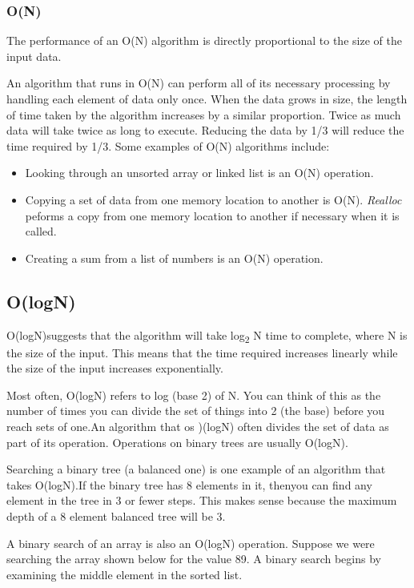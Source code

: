 \subsubsection{O(N)}

The performance of an O(N) algorithm  is directly
proportional to the size of the input data.

An algorithm that runs in O(N) can perform all of its necessary
processing by handling each element of data only once.  When the data
grows in size, the length of time taken by the algorithm increases by a
similar proportion.  Twice as much data will take twice as long to execute.  Reducing the data by 1/3 will reduce the time required by 1/3.
Some examples of O(N) algorithms include:

\begin{itemize}
\item
  \textbf{} Looking through an unsorted array or linked list is an O(N)
  operation.
\item
  Copying a set of data  from one memory location to another is O(N).  \textit{Realloc} peforms a copy from one memory location to another if necessary when it is called.
\item
  Creating a sum from a list of numbers is an O(N) operation.
\end{itemize}



\subsection{O(logN)}

O(logN)suggests that the algorithm will take
log\textsubscript{2} N time to complete, where N is the size of the
input. This means that the time required increases linearly while the
size of the input increases exponentially.

Most often, O(logN) refers to log (base 2) of N. You can think of this
as the number of times you can divide the set of things into 2 (the
base) before you reach sets of one.An algorithm that os )(logN) often
divides the set of data as part of its operation.   Operations on binary trees are usually O(logN).

Searching a binary tree (a balanced one) is one example of an algorithm
that takes O(logN).If the binary tree has 8 elements in it, thenyou can find any element in the tree in 3 or fewer steps. This
makes sense because the maximum depth of a 8 element balanced tree will
be 3.

A binary search of an array is also an O(logN) operation.  Suppose we were searching the array shown below for the value 89.  A binary search begins by examining the middle element in the sorted list.

